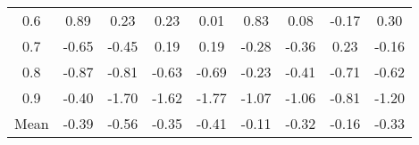 \documentclass[11pt,a4paper]{report}
\begin{document}
\begin{longtable}{ | c || c | c | c | c | c | c | c || c |}
0.6 &  \cellcolor[HTML]{E7E7FF} 0.89 &  \cellcolor[HTML]{F7F7FF} 0.23 &  \cellcolor[HTML]{F7F7FF} 0.23 &  \cellcolor[HTML]{FFFFFF} 0.01 &  \cellcolor[HTML]{E7E7FF} 0.83 &  \cellcolor[HTML]{FFFFFF} 0.08 &  \cellcolor[HTML]{FFF7F7} -0.17 &  \cellcolor[HTML]{F7F7FF} 0.30 \\
0.7 &  \cellcolor[HTML]{FFEFEF} -0.65 &  \cellcolor[HTML]{FFF7F7} -0.45 &  \cellcolor[HTML]{F7F7FF} 0.19 &  \cellcolor[HTML]{F7F7FF} 0.19 &  \cellcolor[HTML]{FFF7F7} -0.28 &  \cellcolor[HTML]{FFF7F7} -0.36 &  \cellcolor[HTML]{F7F7FF} 0.23 &  \cellcolor[HTML]{FFF7F7} -0.16 \\
0.8 &  \cellcolor[HTML]{FFE7E7} -0.87 &  \cellcolor[HTML]{FFE7E7} -0.81 &  \cellcolor[HTML]{FFEFEF} -0.63 &  \cellcolor[HTML]{FFEFEF} -0.69 &  \cellcolor[HTML]{FFF7F7} -0.23 &  \cellcolor[HTML]{FFF7F7} -0.41 &  \cellcolor[HTML]{FFEFEF} -0.71 &  \cellcolor[HTML]{FFEFEF} -0.62 \\
0.9 &  \cellcolor[HTML]{FFF7F7} -0.40 &  \cellcolor[HTML]{FFD7D7} -1.70 &  \cellcolor[HTML]{FFD7D7} -1.62 &  \cellcolor[HTML]{FFCFCF} -1.77 &  \cellcolor[HTML]{FFE7E7} -1.07 &  \cellcolor[HTML]{FFE7E7} -1.06 &  \cellcolor[HTML]{FFE7E7} -0.81 &  \cellcolor[HTML]{FFDFDF} -1.20 \\
\hline
\hline
Mean  &  \cellcolor[HTML]{FFF7F7} -0.39 &  \cellcolor[HTML]{FFEFEF} -0.56 &  \cellcolor[HTML]{FFF7F7} -0.35 &  \cellcolor[HTML]{FFF7F7} -0.41 &  \cellcolor[HTML]{FFFFFF} -0.11 &  \cellcolor[HTML]{FFF7F7} -0.32 &  \cellcolor[HTML]{FFF7F7} -0.16 &  \cellcolor[HTML]{FFF7F7} -0.33 \\
\hline
\end{longtable}
\end{document}
